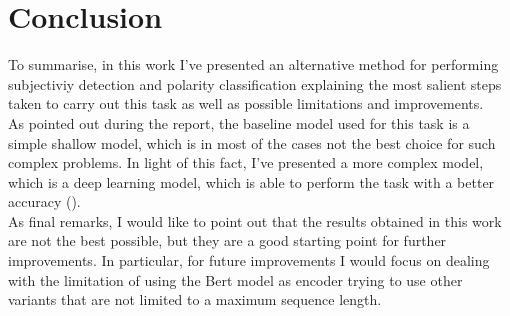 \section{Conclusion}
\label{sec:end}
To summarise, in this work I've presented an alternative method for performing subjectiviy detection and polarity classification explaining the most salient steps taken to 
carry out this task as well as possible limitations and improvements.\\
As pointed out during the report, the baseline model used for this task is a simple shallow model, which is in most of the cases not the best choice for such complex problems. 
In light of this fact, I've presented a more complex model, which is a deep learning model, which is able to perform the task with a better accuracy ().\\
As final remarks, I would like to point out that the results obtained in this work are not the best possible, but they are a good starting point for further improvements. 
In particular, for future improvements I would focus on dealing with the limitation of using the Bert model as encoder trying to use other variants that are not limited to 
a maximum sequence length. 
